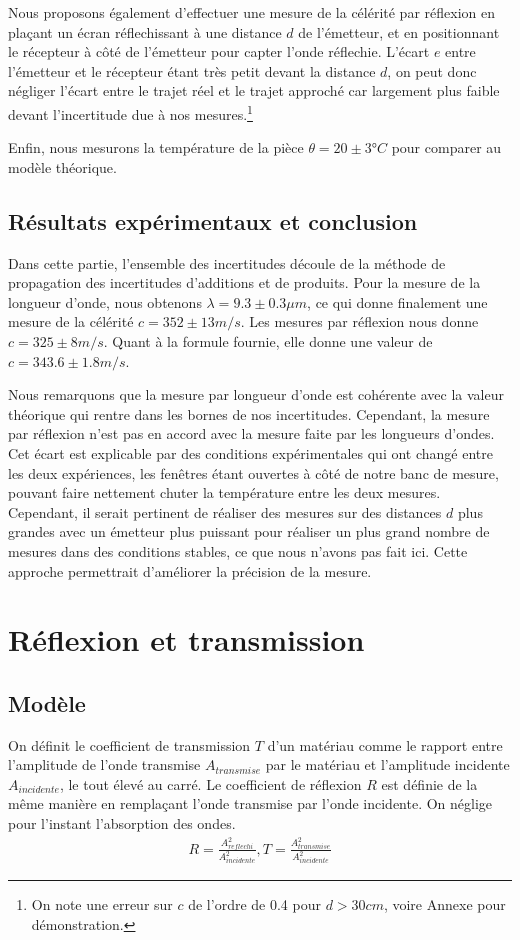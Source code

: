\documentclass[12pt]{article}
\begin{document}
Nous proposons également d'effectuer une mesure de la célérité par réflexion en plaçant un écran réflechissant à une distance $d$ de l'émetteur, et en positionnant le récepteur à côté de l'émetteur pour capter l'onde réflechie.
L'écart $e$ entre l'émetteur et le récepteur étant très petit devant la distance $d$, on peut donc négliger l'écart entre le trajet réel et le trajet approché car largement plus faible devant l'incertitude due à nos mesures.\footnote{On note une erreur sur $c$ de l'ordre de 0.4 pour $d > 30cm$, voire Annexe pour démonstration.}

Enfin, nous mesurons la température de la pièce $\theta = 20 \pm 3 \text{°} C$ pour comparer au modèle théorique.

\break
\subsection{Résultats expérimentaux et conclusion}
Dans cette partie, l'ensemble des incertitudes découle de la méthode de propagation des incertitudes d'additions et de produits.
Pour la mesure de la longueur d'onde, nous obtenons $\lambda = 9.3 \pm 0.3 \mu m$, ce qui donne finalement une mesure de la célérité $c = 352 \pm 13 m/s$. Les mesures par réflexion nous donne $c = 325 \pm 8 m/s$. 
Quant à la formule fournie, elle donne une valeur de $c = 343.6 \pm 1.8 m/s$.

Nous remarquons que la mesure par longueur d'onde est cohérente avec la valeur théorique qui rentre dans les bornes de nos incertitudes. Cependant, la mesure par réflexion
n'est pas en accord avec la mesure faite par les longueurs d'ondes. Cet écart est explicable par des conditions expérimentales qui ont changé entre les deux expériences, les fenêtres étant ouvertes à côté
de notre banc de mesure, pouvant faire nettement chuter la température entre les deux mesures. Cependant, il serait pertinent de réaliser des mesures sur des distances $d$ plus grandes avec un émetteur plus puissant
pour réaliser un plus grand nombre de mesures dans des conditions stables, ce que nous n'avons pas fait ici. Cette approche permettrait d'améliorer la précision de la mesure.

\section{Réflexion et transmission}
\subsection{Modèle}
On définit le coefficient de transmission $T$ d'un matériau comme le rapport entre l'amplitude de l'onde transmise $A_{transmise}$ par le matériau et l'amplitude incidente $A_{incidente}$, le tout élevé au carré. Le coefficient de réflexion $R$ est définie de la même manière en remplaçant l'onde transmise par l'onde incidente. On néglige pour l'instant l'absorption des ondes.
\begin{align}
	R = \frac{A_{reflechi}^2}{A_{incidente}^2}, T = \frac{A_{transmise}^2}{A_{incidente}^2}
\end{align}
\end{document}
